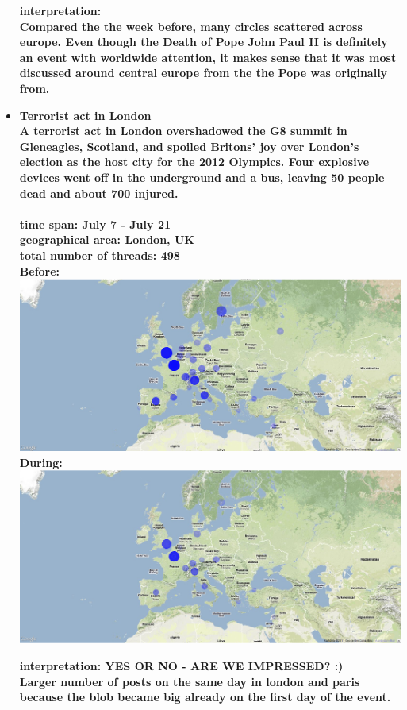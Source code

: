 \documentclass[11pt,a4paper,english]{article}
\begin{document}
\begin{itemize}
					\bf interpretation: \rm
					\\ Compared the the week before, many circles scattered across europe. Even though the Death of Pope John Paul II is definitely an event with worldwide attention, it makes sense that it was most discussed around central europe from the the Pope was originally from.
						


				\item \bf Terrorist act in London \rm
					\\ A terrorist act in London overshadowed the G8 summit in Gleneagles, Scotland, and spoiled Britons' joy over London's election as the host city for the 2012 Olympics. Four explosive devices went off in the underground and a bus, leaving 50 people dead and about 700 injured.
					\\\\ \bf time span: \rm July 7 - July 21
					\\ \bf geographical area: \rm London, UK
					\\ \bf total number of threads: \rm 498
					\\ \bf Before: \rm
					\includegraphics[width=130mm]{img/pre-london}
					\\ \bf During: \rm
					\includegraphics[width=130mm]{img/post-london}
					
					\bf interpretation: \rm YES OR NO - ARE WE IMPRESSED? :)
					\\ Larger number of posts on the same day in london and paris because the blob became big already on the first day of the event.



\end{itemize}
\end{document}
